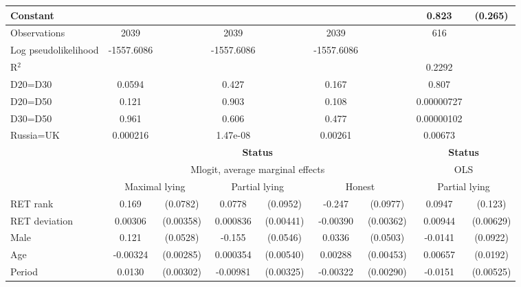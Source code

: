\begin{tabular}{l|cccccc|cc}
Constant        &                  &         &                  &         &                  &         &    0.823\sym{***}&  (0.265)\\
\hline
Observations    &     2039         &         &     2039         &         &     2039         &         &      616         &         \\
Log pseudolikelihood  & -1557.6086   &         &     -1557.6086             &         &        -1557.6086          &         &           &   \\ 
R$^2$      &                  &         &                  &         &                  &         &         0.2292  &   \\ 

D20=D30         &   0.0594         &         &    0.427         &         &    0.167         &         &    0.807         &         \\
D20=D50         &    0.121         &         &    0.903         &         &    0.108         &         &0.00000727         &         \\
D30=D50         &    0.961         &         &    0.606         &         &    0.477         &         &0.00000102         &         \\
Russia=UK       & 0.000216         &         & 1.47e-08         &         &  0.00261         &         &  0.00673         &         \\
\hline\hline
&\multicolumn{6}{c|}{\bf Status}&\multicolumn{2}{c}{\bf Status}\\ &\multicolumn{6}{c|}{Mlogit, average marginal effects }&\multicolumn{2}{c}{OLS}\\
                &\multicolumn{2}{c}{Maximal lying}&\multicolumn{2}{c}{Partial lying}&\multicolumn{2}{c}{Honest}  &\multicolumn{2}{c}{Partial lying}\\
\hline
RET rank        &    0.169\sym{**} & (0.0782)&   0.0778         & (0.0952)&   -0.247\sym{**} & (0.0977)&   0.0947         &  (0.123)\\
RET deviation   &  0.00306         &(0.00358)& 0.000836         &(0.00441)& -0.00390         &(0.00362)&  0.00944         &(0.00629)\\
Male            &    0.121\sym{**} & (0.0528)&   -0.155\sym{***}& (0.0546)&   0.0336         & (0.0503)&  -0.0141         & (0.0922)\\
Age             & -0.00324         &(0.00285)& 0.000354         &(0.00540)&  0.00288         &(0.00453)&  0.00657         & (0.0192)\\
Period          &   0.0130\sym{***}&(0.00302)& -0.00981\sym{***}&(0.00325)& -0.00322         &(0.00290)&  -0.0151\sym{***}&(0.00525)\\

\end{tabular}
